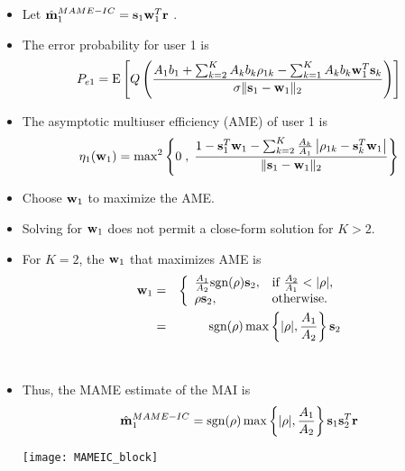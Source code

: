 \documentclass[25pt,landscape]{foils}
\newcommand{\br}{{\mathbf r}}
\newcommand{\bbm}{{\bf m}}
\newcommand{\bs}{{\bf s}}
\newcommand{\bw}{{\bf w}}
\begin{document}
\begin{itemize}
\zerolistvertdimens
\item Let $\hat{\bbm}_{1}^{MAME-IC} = \bs_{1} \bw_{1}^{T} \br$ \enspace .
\item The error probability for user 1 is
$$
P_{e1} = \mbox{E} \left[ Q\left( \frac{A_1b_1+ \sum_{k=2}^{K} A_kb_k\rho_{1k}
-\sum_{k=1}^K A_kb_k \bw_{1}^{T} \bs_k}
{\sigma \|\bs_1-\bw_{1}\|_2}\right)\right]
$$
\item The asymptotic multiuser efficiency (AME) of user 1 is
$$
\eta_1(\bw_{1}) = {\max}^2 \left\{ 0\; ,\; \frac{1-\bs_1^T\bw_{1} -
\sum_{k=2}^{K} \frac{A_k}{A_1} \left| \rho_{1k}-\bs_k^T\bw_{1}\right|  }
{\|\bs_1-\bw_{1}\|_2} \right\}
$$
\item Choose $\bw_{1}$ to maximize the AME.
\end{itemize}

\begin{itemize}
\zerolistvertdimens
\item Solving for $\bw_{1}$ does not permit a close-form solution for
$K>2$.
\item For $K=2$, the $\bw_{1}$ that maximizes AME is \vspace{-.2in}
\begin{eqnarray*}
\bw_{1} & = & \left\{ \begin{array}{ll}{A_1\over
A_2}\mbox{sgn}(\rho)\bs_2 ,&\mbox{if }{A_2\over A_1}<|\rho| ,\\
\rho\bs_2 ,&\mbox{otherwise.}\end{array}\right. \\
 & = & \mbox{sgn}(\rho) \max \left\{ |\rho|, \frac{A_{1}}{A_{2}} \right\}
 \bs_{2}
\end{eqnarray*} \vspace{-.4in} \\
\item Thus, the MAME estimate of the MAI is \vspace{-.2in}
$$
\hat{\bbm}_{1}^{MAME-IC} = \mbox{sgn}(\rho) \max \left\{ |\rho|,
\frac{A_{1}}{A_{2}} \right\} \bs_{1} \bs_{2}^{T} \br
$$
\centerline{\texttt{[image: MAMEIC\_block]}}
\end{itemize}
\end{document}
